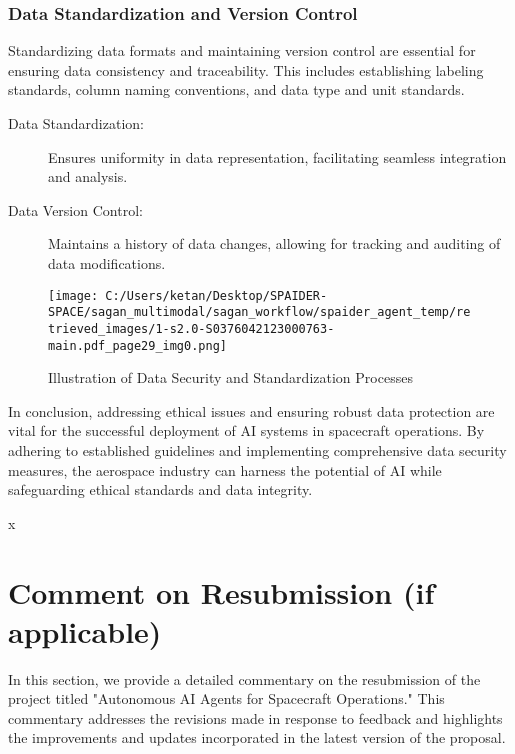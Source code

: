 \documentclass[a4paper,12pt]{article}
\begin{document}
\subsubsection{Data Standardization and Version Control}

Standardizing data formats and maintaining version control are essential for ensuring data consistency and traceability. This includes establishing labeling standards, column naming conventions, and data type and unit standards.

\begin{description}
    \item[Data Standardization:] Ensures uniformity in data representation, facilitating seamless integration and analysis.
    \item[Data Version Control:] Maintains a history of data changes, allowing for tracking and auditing of data modifications.
\end{description}

\begin{figure}[htbp]
    \centering
    \texttt{[image: C:/Users/ketan/Desktop/SPAIDER-SPACE/sagan\_multimodal/sagan\_workflow/spaider\_agent\_temp/retrieved\_images/1-s2.0-S0376042123000763-main.pdf\_page29\_img0.png]}
    \caption{Illustration of Data Security and Standardization Processes}
    \label{fig:data_security_standardization}
\end{figure}

In conclusion, addressing ethical issues and ensuring robust data protection are vital for the successful deployment of AI systems in spacecraft operations. By adhering to established guidelines and implementing comprehensive data security measures, the aerospace industry can harness the potential of AI while safeguarding ethical standards and data integrity.






x
\section{Comment on Resubmission (if applicable)}

In this section, we provide a detailed commentary on the resubmission of the project titled "Autonomous AI Agents for Spacecraft Operations." This commentary addresses the revisions made in response to feedback and highlights the improvements and updates incorporated in the latest version of the proposal.
\end{document}
